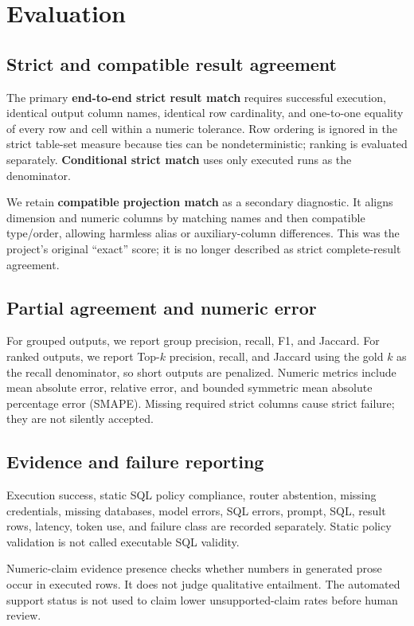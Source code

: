 \documentclass[11pt]{article}
\begin{document}
\section{Evaluation}

\subsection{Strict and compatible result agreement}
The primary \textbf{end-to-end strict result match} requires successful
execution, identical output column names, identical row cardinality, and
one-to-one equality of every row and cell within a numeric tolerance. Row
ordering is ignored in the strict table-set measure because ties can be
nondeterministic; ranking is evaluated separately. \textbf{Conditional strict
match} uses only executed runs as the denominator.

We retain \textbf{compatible projection match} as a secondary diagnostic. It
aligns dimension and numeric columns by matching names and then compatible
type/order, allowing harmless alias or auxiliary-column differences. This was the
project's original ``exact'' score; it is no longer described as strict
complete-result agreement.

\subsection{Partial agreement and numeric error}
For grouped outputs, we report group precision, recall, F1, and Jaccard. For
ranked outputs, we report Top-$k$ precision, recall, and Jaccard using the gold
$k$ as the recall denominator, so short outputs are penalized. Numeric metrics
include mean absolute error, relative error, and bounded symmetric mean absolute
percentage error (SMAPE). Missing required strict columns cause strict failure;
they are not silently accepted.

\subsection{Evidence and failure reporting}
Execution success, static SQL policy compliance, router abstention, missing
credentials, missing databases, model errors, SQL errors, prompt, SQL, result
rows, latency, token use, and failure class are recorded separately. Static
policy validation is not called executable SQL validity.

Numeric-claim evidence presence checks whether numbers in generated prose occur
in executed rows. It does not judge qualitative entailment. The automated support
status is not used to claim lower unsupported-claim rates before human review.
\end{document}
